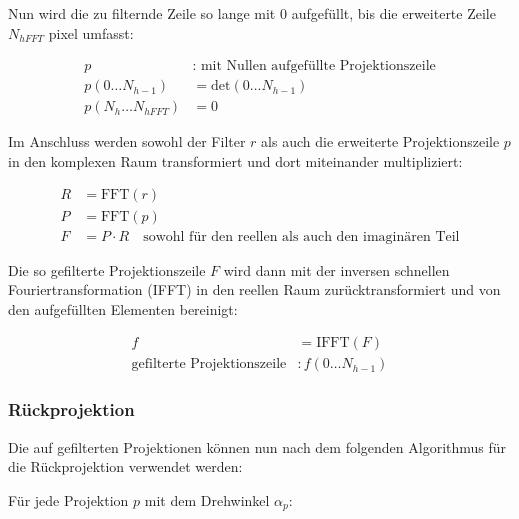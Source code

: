 Nun wird die zu filternde Zeile so lange mit $0$ aufgefüllt, bis die erweiterte Zeile $N_{hFFT}$ \gls{pixel} umfasst:

\begin{equation}
    \begin{aligned}
        p &: \text{ mit Nullen aufgefüllte Projektionszeile}\\
        p(0 \dots N_{h - 1}) &= \text{det}(0 \dots N_{h - 1})\\
        p(N_{h} \dots N_{hFFT}) &= 0
    \end{aligned}
\end{equation}

Im Anschluss werden sowohl der Filter $r$ als auch die erweiterte Projektionszeile $p$ in den komplexen Raum
transformiert und dort miteinander multipliziert:

\begin{equation}
    \begin{aligned}
        R &= \text{FFT}(r)\\
        P &= \text{FFT}(p)\\
        F &= P \cdot R \quad \text{sowohl für den reellen als auch den imaginären Teil}
    \end{aligned}
\end{equation}

Die so gefilterte Projektionszeile $F$ wird dann mit der inversen schnellen Fouriertransformation (IFFT) in den
reellen Raum zurücktransformiert und von den {\glqq}aufgefüllten{\grqq} Elementen bereinigt:

\begin{equation}
    \begin{aligned}
        f &= \text{IFFT}(F)\\
        \text{gefilterte Projektionszeile} &: f(0 \dots N_{h - 1})
    \end{aligned}
\end{equation}

\subsubsection{Rückprojektion}

Die auf gefilterten Projektionen können nun nach dem folgenden Algorithmus für die Rückprojektion verwendet werden:

Für jede Projektion $p$ mit dem Drehwinkel $\alpha_p$:

